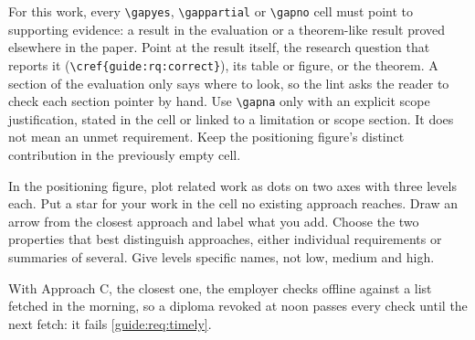 For this work, every \texttt{\textbackslash gapyes}, \texttt{\textbackslash gappartial} or \texttt{\textbackslash gapno} cell must point to supporting evidence: a result in the evaluation or a theorem-like result proved elsewhere in the paper. Point at the result itself, the research question that reports it (\texttt{\textbackslash cref\{guide:rq:correct\}}), its table or figure, or the theorem. A section of the evaluation only says where to look, so the lint asks the reader to check each section pointer by hand. Use \texttt{\textbackslash gapna} only with an explicit scope justification, stated in the cell or linked to a limitation or scope section. It does not mean an unmet requirement. Keep the positioning figure's distinct contribution in the previously empty cell.

In the positioning figure, plot related work as dots on two axes with three levels each. Put a star for your work in the cell no existing approach reaches. Draw an arrow from the closest approach and label what you add. Choose the two properties that best distinguish approaches, either individual requirements or summaries of several. Give levels specific names, not low, medium and high.
\begin{runningexample}[elsewhere]
With Approach C, the closest one, the employer checks offline against a list fetched in the morning, so a diploma revoked at noon passes every check until the next fetch: it fails \cref{guide:req:timely}.
\end{runningexample}

